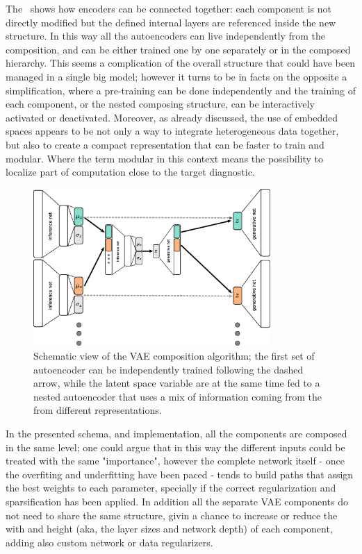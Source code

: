 The~\Figure{\ref{fig:VAE_compose}} shows how encoders can be connected together: each component is not directly modified but the defined internal layers are referenced inside the new structure. In this way all the autoencoders can live independently from the composition, and can be either trained one by one separately or in the composed hierarchy. This seems a complication of the overall structure that could have been managed in a single big model; however it turns to be in facts on the opposite a simplification, where a pre-training can be done independently and the training of each component, or the nested composing structure, can be interactively activated or deactivated.
Moreover, as already discussed, the use of embedded spaces appears to be not only a way to integrate heterogeneous data together, but also to create a compact representation that can be faster to train and modular. Where the term modular in this context means the possibility to localize part of computation close to the target diagnostic.
\begin{figure}
    \centering
    \includegraphics[height=6cm]{img/3_ML/VAE_COMPOSE.eps}
    \caption{Schematic view of the VAE composition algorithm; the first set of autoencoder can be independently trained following the dashed arrow, while the latent space variable are at the same time fed to a nested autoencoder that uses a mix of information coming from the from different representations. }
    \label{fig:VAE_compose}
\end{figure}
%
In the presented schema, and implementation, all the components are composed in the same level; one could argue that in this way the different inputs could be treated with the same "importance", however the complete network itself - once the overfiting and underfitting have been paced - tends to build paths that assign the best weights to each parameter, specially if the correct regularization and sparsification has been applied. In addition all the separate \acs{VAE} components do not need to share the same structure, givin a chance to increase or reduce the with and height (aka, the layer sizes and network depth) of each component, adding also custom network or data regularizers.

